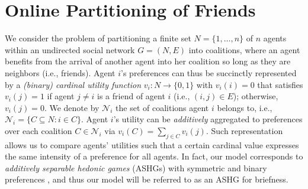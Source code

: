 \documentclass[letterpaper]{article} %
\begin{document}
\section{Online Partitioning of Friends}
\label{sec:Online Partitioning of Friends}
We consider the problem of partitioning a finite set $N = \{1, \dots, n\}$ of $n$ agents within an undirected social network $G = (N, E)$ into coalitions, where an agent benefits from the arrival of another agent into her coalition so long as they are neighbors (i.e., friends). %
Agent $i$'s preferences can thus be succinctly represented by a \textit{(binary) cardinal utility function} $v_i: N \rightarrow \{0,1\}$ with $v_i(i) = 0$ that satisfies $v_i(j) = 1$ if agent $j \neq i$ is a friend of agent $i$ (i.e., $(i,j) \in E$); otherwise, $v_i(j) = 0$. We denote by $\mathcal{N}_i$ the set of coalitions agent $i$ belongs to, i.e., $\mathcal{N}_i = \{C \subseteq N : i \in C\}$. Agent $i$'s utility can be \textit{additively} aggregated to preferences over each coalition $C \in \mathcal{N}_i$ via $v_i(C) = \sum_{j \in C} v_i(j)$. Such representation allows us to compare agents’ utilities such that a certain cardinal value expresses the same intensity of a preference for all agents. In fact, our model corresponds to \textit{additively separable hedonic games} (ASHGs) with symmetric and binary preferences \cite{bullinger2020pareto}, and thus our model will be referred to as an ASHG for briefness. %
%

\end{document}
